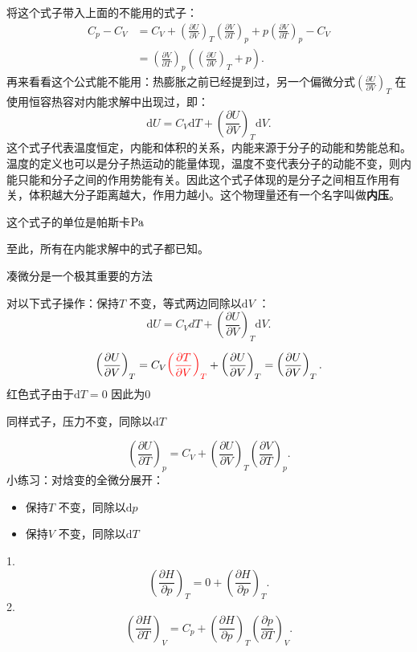 将这个式子带入上面的不能用的式子：
\begin{align*}
    C_{p}-C_{V} &= C_{V} + \left(\frac{\partial U}{\partial V}\right)_{T}\left(\frac{\partial V}{\partial T}\right)_{p}+p\left(\frac{\partial V}{\partial T}\right)_{p}-C_{V}\\
    &= \left(\frac{\partial V}{\partial T}\right)_{p}\left( \left(\frac{\partial U}{\partial V}\right)_{T}+p \right)
.\end{align*}
再来看看这个公式能不能用：热膨胀之前已经提到过，另一个偏微分式$\left(\frac{\partial U}{\partial V}\right)_{T}$ 在使用恒容热容对内能求解中出现过，即：\[
    \mathrm{d}U = C_{V}\mathrm{d}T + \left(\frac{\partial U}{\partial V}\right)_{T}\mathrm{d}V
.\]
这个式子代表温度恒定，内能和体积的关系，内能来源于分子的动能和势能总和。温度的定义也可以是分子热运动的能量体现，温度不变代表分子的动能不变，则内能只能和分子之间的作用势能有关。因此这个式子体现的是分子之间相互作用有关，体积越大分子距离越大，作用力越小。这个物理量还有一个名字叫做\textbf{内压}。
\begin{notation}
    这个式子的单位是帕斯卡$\ce{Pa}$
\end{notation}
至此，所有在内能求解中的式子都已知。
\begin{notation}
    凑微分是一个极其重要的方法
\end{notation}
\begin{eg}
    对以下式子操作：保持$T$ 不变，等式两边同除以$\mathrm{d}V$ ：\[
        \mathrm{d}U = C_{V}dT + \left(\frac{\partial U}{\partial V}\right)_{T}\mathrm{d}V
    .\]
\end{eg}
\[
    \left(\frac{\partial U}{\partial V}\right)_{T} = C_{V}\textcolor{red}{\left(\frac{\partial T}{\partial V}\right)_{T}} + \left(\frac{\partial U}{\partial V}\right)_{T} = \left(\frac{\partial U}{\partial V}\right)_{T}
.\]
红色式子由于$\mathrm{d}T=0$ 因此为0
\begin{eg}
    同样式子，压力不变，同除以$\mathrm{d}T$
\end{eg}
\[
    \left(\frac{\partial U}{\partial T}\right)_{p} = C_{V} + \left(\frac{\partial U}{\partial V}\right)_{T}\left(\frac{\partial V}{\partial T}\right)_{p}
.\]
小练习：对焓变的全微分展开：
\begin{itemize}
    \item 保持$T$ 不变，同除以$\mathrm{d}p$
    \item 保持$V$ 不变，同除以$\mathrm{d}T$
    
\end{itemize}
\begin{sol}
    1. \[
        \left(\frac{\partial H}{\partial p}\right)_{T} = 0+\left(\frac{\partial H}{\partial p}\right)_{T}
    .\]
    2. \[
        \left(\frac{\partial H}{\partial T}\right)_{V} = C_{p} + \left(\frac{\partial H}{\partial p}\right)_{T}\left(\frac{\partial p}{\partial T}\right)_{V}
    .\]
\end{sol}
